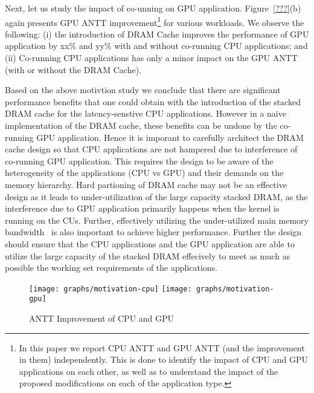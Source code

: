 Next, let us study the impact of co-unning on GPU application.  Figure~\ref{???}(b) again presents GPU ANTT improvement\footnote{In this 
paper we report CPU ANTT and GPU ANTT (and the improvement in them) independently. This is done to identify the impact of CPU 
and GPU applications on each other, as well as to understand the impact of the proposed modifications on each of the application
type.} for various workloads. 
We observe the following: 
(i)  the introduction of DRAM Cache improves the performance of GPU application by xx\% and yy\% with and without co-running CPU applications;
and (ii) Co-running CPU applications has only a minor impact on the GPU ANTT (with or without the DRAM Cache). 


Based on the above motivtion study we conclude that there are significant performance benefits that one could obtain 
with the introduction of the stacked DRAM cache for the latency-senstive CPU applications. However in a naive implementation
of the DRAM cache, these benefits can be undone by the co-running GPU application.  Hence it is imporant to carefully 
architect the DRAM cache design so that CPU applications are not hampered due to interference of co-running GPU application.
This requires the design to be aware of the heterogeneity of the applications (CPU vs GPU) and their demands on the 
memory hierarchy.  Hard partioning of DRAM cache may not be an effective design as it leads to under-utilization of the large capacity 
stacked DRAM, as the interference due to GPU application primarily happens when the kernel is running on the CUs. 
Further, effectively utilizing the under-utilized main memory bandwidth~\cite{Nagendra's Memsys paper, Mainak's HPCA paper}
is also important to achieve higher performance.  Further the design should ensure that the CPU applications and the 
GPU application are able to utilize the large capacity of the stacked DRAM effecively to meet as much as possible the working set 
requirements of the applications. 

\begin{figure}[htbp]
   \texttt{[image: graphs/motivation-cpu]}
   \texttt{[image: graphs/motivation-gpu]}
   \caption{ANTT Improvement of CPU and GPU}
   \label{fig:motivation}
\end{figure}
